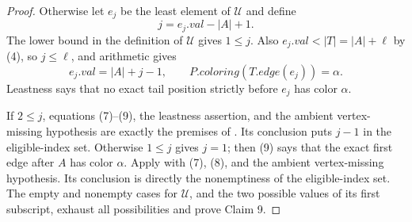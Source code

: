 \begin{proof}
Otherwise let \(e_j\) be the least element of \(\mathcal U\) and define
\[
                  j=e_j.\mathit{val}-|A|+1.
\]
The lower bound in the definition of \(\mathcal U\) gives \(1\leq j\).
Also \(e_j.\mathit{val}<|T|=|A|+\ell\) by (4), so \(j\leq\ell\), and
arithmetic gives
\[
 e_j.\mathit{val}=|A|+j-1,\qquad
 P.\mathit{coloring}(T.\mathit{edge}(e_j))=\alpha.            \tag{9}
\]
Leastness says that no exact tail position strictly before \(e_j\) has
color \(\alpha\).

If \(2\leq j\), equations (7)--(9), the leastness assertion, and the
ambient vertex-missing hypothesis are exactly the premises of
.  Its conclusion puts
\(j-1\) in the eligible-index set.  Otherwise \(1\leq j\) gives \(j=1\);
then (9) says that the exact first edge after \(A\) has color \(\alpha\).
Apply  with (7), (8), and the
ambient vertex-missing hypothesis.  Its
conclusion is directly the nonemptiness of the eligible-index set.  The
empty and nonempty cases for \(\mathcal U\), and the two possible values
of its first subscript, exhaust all possibilities and prove Claim 9.
\end{proof}
